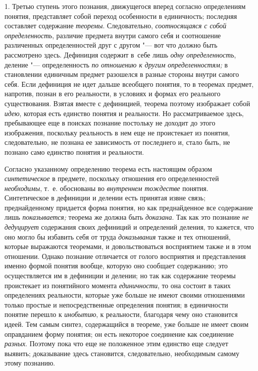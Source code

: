 1. Третью ступень этого познания, движущегося вперед согласно
определениям понятия, представляет собой переход особенности в единичность;
последняя составляет содержание {\em теоремы}. Следовательно,
{\em соотносящаяся с собой
определенность}, различие предмета внутри самого себя и
соотношение различенных определенностей друг с другом "--- вот
что должно быть рассмотрено здесь. Дефиниция содержит в~себе лишь
{\em одну определенность}, деление "--- определенность {\em по отношению
к другим определенностям;} в становлении единичным предмет разошелся
в разные стороны внутри самого себя. Если дефиниция не идет дальше
всеобщего понятия, то в теоремах предмет, напротив, познан в его
реальности, в условиях и формах его реального существования. Взятая вместе
с дефиницией, теорема поэтому изображает собой
{\em идею}, которая есть
единство понятия и реальности. Но рассматриваемое здесь, пребывающее еще в
поисках познание постольку не доходит до этого изображения, поскольку
реальность в нем еще не проистекает из понятия, следовательно, не познана
ее зависимость от последнего и, стало быть, не познано само единство
понятия и реальности.

Согласно указанному определению теорема есть настоящим образом
{\em синтетическое} в
предмете, поскольку отношения его определенностей
{\em необходимы}, т.~е.
обоснованы во {\em внутреннем
тождестве} понятия. Синтетическое в дефиниции и делении есть
принятая извне связь; преднайденному придается форма понятия, но как
преднайденное все содержание лишь
{\em показывается;}
теорема же должна быть
{\em доказана}. Так как
это познание {\em не дедуцирует}
содержания своих дефиниций и определений деления, то кажется,
что оно могло бы избавить себя от труда
{\em доказывания} также и
тех отношений, которые выражаются теоремами, и довольствоваться восприятием
также и в этом отношении. Однако познание отличается от голого восприятия и
представления именно формой понятия вообще, которую оно сообщает
содержанию; это осуществляется им в дефиниции и делении; но так как
содержание теоремы проистекает из понятийного момента
{\em единичности}, то она
состоит в таких определениях реальности, которые уже больше не имеют своими
отношениями только простые и непосредственные определения понятия; в
единичности понятие перешло к
{\em инобытию}, к
реальности, благодаря чему оно становится идеей. Тем самым синтез,
содержащийся в теореме, уже больше не имеет своим оправданием форму
понятия; он есть некоторое соединение как соединение
{\em разных}. Поэтому
пока что еще не положенное этим единство еще следует выявить; доказывание
здесь становится, следовательно, необходимым самому этому познанию.


